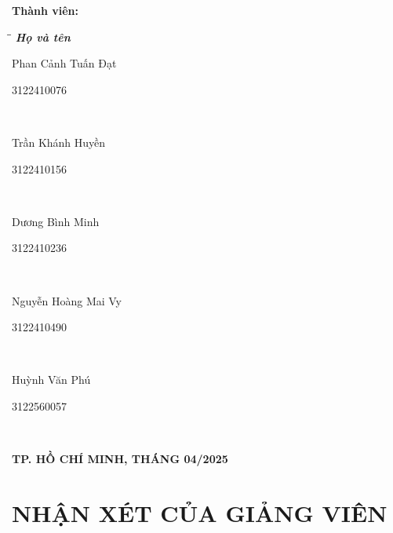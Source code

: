\documentclass[a4paper,12pt]{report}
\begin{document}
\begin{titlepage}
    \vspace{10pt}
    \textbf{Thành viên:}
    \begin{tabbing}
        \hspace{8cm}\=\hspace{3cm}\=\hspace{3cm} \kill
        {\it \textbf{Họ và tên}}\\
        \begin{bfseries}Phan Cảnh Tuấn Đạt\end{bfseries}\> \begin{bfseries}3122410076\end{bfseries}\\
        \begin{bfseries}Trần Khánh Huyền\end{bfseries}\> \begin{bfseries}3122410156\end{bfseries}\\
        \begin{bfseries}Dương Bình Minh\end{bfseries}\> \begin{bfseries}3122410236\end{bfseries}\\
        \begin{bfseries}Nguyễn Hoàng Mai Vy\end{bfseries}\> \begin{bfseries}3122410490\end{bfseries}\\
        \begin{bfseries}Huỳnh Văn Phú\end{bfseries}\> \begin{bfseries}3122560057\end{bfseries}\\

    \end{tabbing}
    \vspace{70pt}
    \begin{center}
        \textbf{TP. HỒ CHÍ MINH, THÁNG 04/2025}
    \end{center}
\end{titlepage}
\newpage
\thispagestyle{empty} %
\mbox{} %
\newpage
\setcounter{page}{1} %
\chapter*{NHẬN XÉT CỦA GIẢNG VIÊN}
\end{document}
